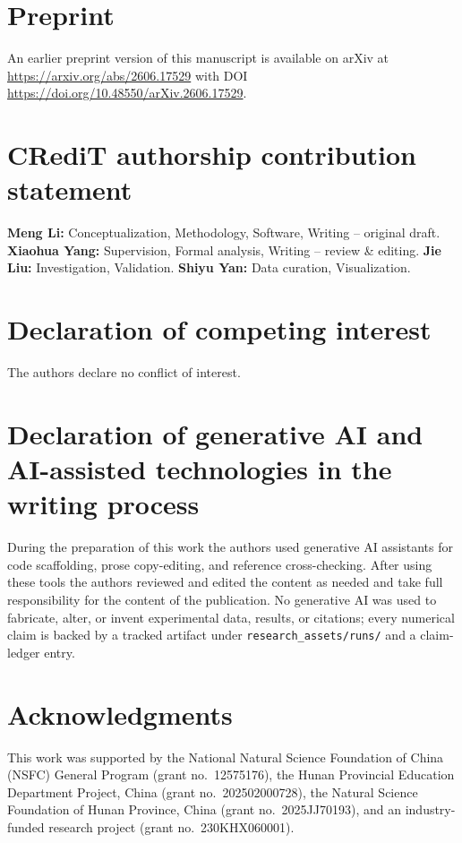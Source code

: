 \documentclass[preprint,12pt,authoryear]{elsarticle}
\begin{document}
\section*{Preprint}
An earlier preprint version of this manuscript is available on arXiv at \url{https://arxiv.org/abs/2606.17529} with DOI \url{https://doi.org/10.48550/arXiv.2606.17529}.

\section*{CRediT authorship contribution statement}
\textbf{Meng Li:} Conceptualization, Methodology, Software, Writing -- original draft. \textbf{Xiaohua Yang:} Supervision, Formal analysis, Writing -- review \& editing. \textbf{Jie Liu:} Investigation, Validation. \textbf{Shiyu Yan:} Data curation, Visualization.

\section*{Declaration of competing interest}
The authors declare no conflict of interest.

\section*{Declaration of generative AI and AI-assisted technologies in the writing process}
During the preparation of this work the authors used generative AI assistants for code scaffolding, prose copy-editing, and reference cross-checking. After using these tools the authors reviewed and edited the content as needed and take full responsibility for the content of the publication. No generative AI was used to fabricate, alter, or invent experimental data, results, or citations; every numerical claim is backed by a tracked artifact under \texttt{research\_assets/runs/} and a claim-ledger entry.

\section*{Acknowledgments}
This work was supported by the National Natural Science Foundation of China (NSFC) General Program (grant no.\ 12575176), the Hunan Provincial Education Department Project, China (grant no.\ 202502000728), the Natural Science Foundation of Hunan Province, China (grant no.\ 2025JJ70193), and an industry-funded research project (grant no.\ 230KHX060001).
\end{document}
